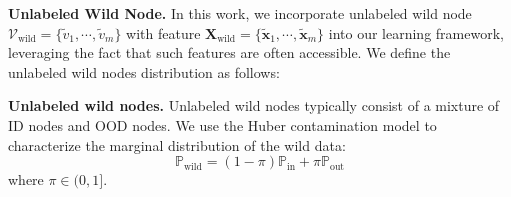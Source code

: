 \textbf{Unlabeled Wild Node.} In this work, we incorporate unlabeled wild node $\mathcal{V}_{\mathrm{wild}} = \{ \tilde{v}_1, \cdots, \tilde{v}_m \}$ with feature $\boldsymbol{X}_{\mathrm{wild}} = \{ \tilde{\mathbf{x}}_1, \cdots, \tilde{\mathbf{x}}_m \}$ into our learning framework, leveraging the fact that such features are often accessible. We define the unlabeled wild nodes distribution as follows:
\begin{definition}\textbf{Unlabeled wild nodes.}
Unlabeled wild nodes typically consist of a mixture of ID nodes and OOD nodes. We use the Huber contamination model \citep{huber1992robust} to characterize the marginal distribution of the wild data:
\begin{equation}
\mathbb{P}_{\mathrm{wild}} = (1-\pi)\mathbb{P}_{\mathrm{in}} + \pi \mathbb{P}_{\mathrm{out}}
\end{equation}
where $\pi \in (0,1]$.
\end{definition}


